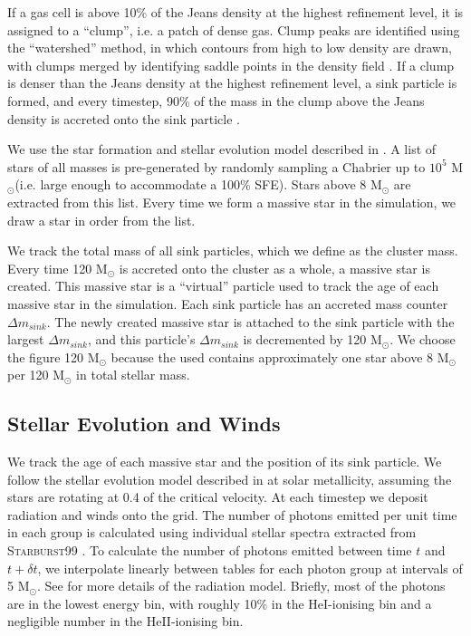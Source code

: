 \documentclass[a4paper,fleqn,usenatbib]{mnras}
\newcommand{\Msolar}{M$_{\odot}$\xspace}
\begin{document}
If a gas cell is above 10\% of the Jeans density at the highest refinement level, it is assigned to a ``clump'', i.e. a patch of dense gas. Clump peaks are identified using the ``watershed'' method, in which contours from high to low density are drawn, with clumps merged by identifying saddle points in the density field \citep{Bleuler2014}. If a clump is denser than the Jeans density at the highest refinement level, a sink particle is formed, and every timestep, 90\% of the mass in the clump above the Jeans density is accreted onto the sink particle \citep{Bleuler2014a}.

We use the star formation and stellar evolution model described in \citet{Geen2018}. A list of stars of all masses is pre-generated by randomly sampling a Chabrier \IMF \citep{Chabrier2003} up to $10^5$ \Msolar (i.e. large enough to accommodate a 100\% SFE). Stars above 8 \Msolar are extracted from this list. Every time we form a massive star in the simulation, we draw a star in order from the list.

We track the total mass of all sink particles, which we define as the cluster mass. Every time 120 \Msolar is accreted onto the cluster as a whole, a massive star is created. This massive star is a ``virtual'' particle used to track the age of each massive star in the simulation. Each sink particle has an accreted mass counter $\Delta m_{sink}$. The newly created massive star is attached to the sink particle with the largest $\Delta m_{sink}$, and this particle's $\Delta m_{sink}$ is decremented by 120 \Msolar. We choose the figure 120 \Msolar because the \IMF used contains approximately one star above 8 \Msolar per 120 \Msolar in total stellar mass.

\subsection{Stellar Evolution and Winds}

We track the age of each massive star and the position of its sink particle. We follow the stellar evolution model described in \citet{Ekstrom2012} at solar metallicity, assuming the stars are rotating at 0.4 of the critical velocity. At each timestep we deposit radiation and winds onto the grid. The number of photons emitted per unit time in each group is calculated using individual stellar spectra extracted from \textsc{Starburst99} \citep{Leitherer2014}. To calculate the number of photons emitted between time $t$ and $t+\delta t$, we interpolate linearly between tables for each photon group at intervals of 5 \Msolar. See \cite{Geen2018} for more details of the radiation model. Briefly, most of the photons are in the lowest energy bin, with roughly 10\% in the HeI-ionising bin and a negligible number in the HeII-ionising bin.
\end{document}
